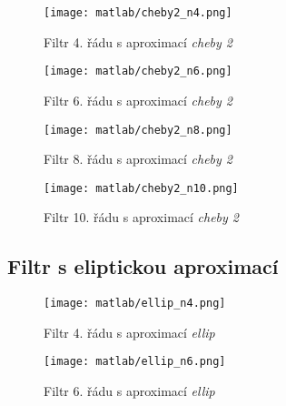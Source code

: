 \documentclass[11pt, a4paper]{article}
\begin{document}
            \begin{figure}[H]
                \centering
                \begin{minipage}{.5\textwidth}
                    \centering
                    \texttt{[image: matlab/cheby2\_n4.png]}
                    \caption{Filtr 4. řádu s aproximací \textit{cheby 2}}
                    \label{fig:9}
                \end{minipage}%
                \begin{minipage}{.5\textwidth}
                    \centering
                    \texttt{[image: matlab/cheby2\_n6.png]}
                    \caption{Filtr 6. řádu s aproximací \textit{cheby 2}}
                    \label{fig:10}
                \end{minipage}
            \end{figure}
        
            \begin{figure}[H]
                \centering
                \begin{minipage}{.5\textwidth}
                    \centering
                    \texttt{[image: matlab/cheby2\_n8.png]}
                    \caption{Filtr 8. řádu s aproximací \textit{cheby 2}}
                    \label{fig:11}
                \end{minipage}%
                \begin{minipage}{.5\textwidth}
                    \centering
                    \texttt{[image: matlab/cheby2\_n10.png]}
                    \caption{Filtr 10. řádu s aproximací \textit{cheby 2}}
                    \label{fig:12}
                \end{minipage}
            \end{figure}
        
        \subsection{Filtr s eliptickou aproximací}
            
            \begin{figure}[H]
                \centering
                \begin{minipage}{.5\textwidth}
                    \centering
                    \texttt{[image: matlab/ellip\_n4.png]}
                    \caption{Filtr 4. řádu s aproximací \textit{ellip}}
                    \label{fig:13}
                \end{minipage}%
                \begin{minipage}{.5\textwidth}
                    \centering
                    \texttt{[image: matlab/ellip\_n6.png]}
                    \caption{Filtr 6. řádu s aproximací \textit{ellip}}
                    \label{fig:14}
                \end{minipage}
            \end{figure}
        
\end{document}
